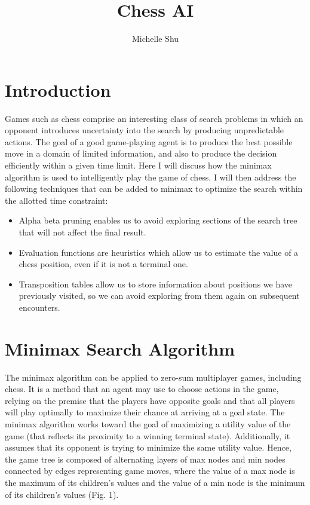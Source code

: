 \documentclass{article}
\title{Chess AI}
\author{Michelle Shu}
\begin{document}
\maketitle

\section{Introduction}

Games such as chess comprise an interesting class of search problems in which an opponent introduces uncertainty into the search by producing unpredictable actions. The goal of a good game-playing agent is to produce the best possible move in a domain of limited information, and also to produce the decision efficiently within a given time limit. Here I will discuss how the minimax algorithm is used to intelligently play the game of chess. I will then address the following techniques that can be added to minimax to optimize the search within the allotted time constraint:

\begin{itemize}
\item Alpha beta pruning enables us to avoid exploring sections of the search tree that will not affect the final result.
\item Evaluation functions are heuristics which allow us to estimate the value of a chess position, even if it is not a terminal one.
\item Transposition tables allow us to store information about positions we have previously visited, so we can avoid exploring from them again on subsequent encounters.
\end{itemize}

\section{Minimax Search Algorithm}

The minimax algorithm can be applied to zero-sum multiplayer games, including chess. It is a method that an agent may use to choose actions in the game, relying on the premise that the players have opposite goals and that all players will play optimally to maximize their chance at arriving at a goal state. The minimax algorithm works toward the goal of maximizing a utility value of the game (that reflects its proximity to a winning terminal state). Additionally, it assumes that its opponent is trying to minimize the same utility value. Hence, the game tree is composed of alternating layers of max nodes and min nodes connected by edges representing game moves, where the value of a max node is the maximum of its children's values and the value of a min node is the minimum of its children's values (Fig. 1).
\end{document}
